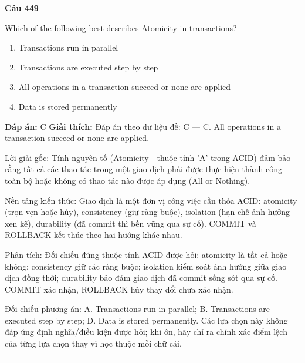\documentclass[11pt,a4paper]{article}
\newenvironment{question}[1]{%
  \par\vspace{1em}\noindent\textbf{\large Câu #1}\par\vspace{0.4em}
}{%
  \par\vspace{1em}\hrule\vspace{0.6em}
}
\newenvironment{choices}{%
  \begin{enumerate}[label=\textbf{\Alph*.},leftmargin=2.2em,itemsep=2pt,topsep=3pt]
}{%
  \end{enumerate}
}
\newcommand{\choice}{\item}
\begin{document}
\begin{question}{449}
Which of the following best describes Atomicity in transactions?
\begin{choices}
\choice Transactions run in parallel
\choice Transactions are executed step by step
\choice All operations in a transaction succeed or none are applied
\choice Data is stored permanently
\end{choices}
\textbf{Đáp án:} C
\textbf{Giải thích:} Đáp án theo dữ liệu đề: C — C. All operations in a transaction succeed or none are applied.

Lời giải gốc: Tính nguyên tố (Atomicity - thuộc tính 'A' trong ACID) đảm bảo rằng tất cả các thao tác trong một giao dịch phải được thực hiện thành công toàn bộ hoặc không có thao tác nào được áp dụng (All or Nothing).

Nền tảng kiến thức: Giao dịch là một đơn vị công việc cần thỏa ACID: atomicity (trọn vẹn hoặc hủy), consistency (giữ ràng buộc), isolation (hạn chế ảnh hưởng xen kẽ), durability (đã commit thì bền vững qua sự cố). COMMIT và ROLLBACK kết thúc theo hai hướng khác nhau.

Phân tích: Đối chiếu đúng thuộc tính ACID được hỏi: atomicity là tất-cả-hoặc-không; consistency giữ các ràng buộc; isolation kiểm soát ảnh hưởng giữa giao dịch đồng thời; durability bảo đảm giao dịch đã commit sống sót qua sự cố. COMMIT xác nhận, ROLLBACK hủy thay đổi chưa xác nhận.

Đối chiếu phương án: A. Transactions run in parallel; B. Transactions are executed step by step; D. Data is stored permanently. Các lựa chọn này không đáp ứng định nghĩa/điều kiện được hỏi; khi ôn, hãy chỉ ra chính xác điểm lệch của từng lựa chọn thay vì học thuộc mỗi chữ cái.
\end{question}
\end{document}

